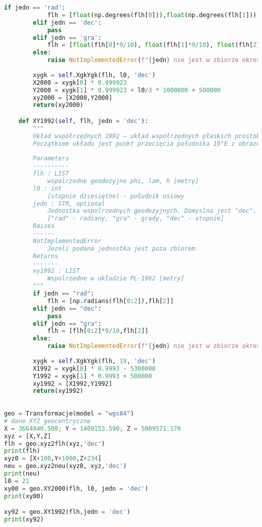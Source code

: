 \begin{lstlisting}[caption={\emph{Treść programu}}, language=Python]
        if jedn == 'rad':
            flh = [float(np.degrees(flh[0])),float(np.degrees(flh[1])),float(flh[2])]
        elif jedn == 'dec':
            pass
        elif jedn == 'gra':
            flh = [float(flh[0]*9/10), float(flh[1]*9/10), float(flh[2])]
        else:
            raise NotImplementedError(f"{jedn} nie jest w zbiorze okreslen")
       
        xygk = self.XgkYgk(flh, l0, 'dec')
        X2000 = xygk[0] * 0.999923 
        Y2000 = xygk[1] * 0.999923 + l0/3 * 1000000 + 500000
        xy2000 = [X2000,Y2000]
        return(xy2000)

    def XY1992(self, flh, jedn = 'dec'):
        """
        Układ współrzędnych 1992 – układ współrzędnych płaskich prostokątnych oparty na odwzorowaniu Gaussa-Krügera dla elipsoidy GRS80 w jednej dziesięciostopniowej strefie.
        Początkiem układu jest punkt przecięcia południka 19°E z obrazem równika.
        
        Parameters
        ----------
        flh : LIST
            wspolrzedne geodezyjne phi, lam, h [metry]
        l0 : int
            [stopnie dziesiętne] - południk osiowy
        jedn : STR, optional
            Jednostka wspolrzednych geodezyjnych. Domyslna jest "dec".
            ["rad" - radiany, "gra" - grady, "dec" - stopnie]
        Raises
        ------
        NotImplementedError
            Jezeli podana jednostka jest poza zbiorem.
        Returns
        -------
        xy1992 : LIST
            Wspolrzedne w układzie PL-1992 [metry]
        """
        if jedn == "rad":
            flh = [np.radians(flh[0:2]),flh[2]]
        elif jedn == "dec":
            pass
        elif jedn == "gra":
            flh = [flh[0:2]*9/10,flh[2]]
        else:
            raise NotImplementedError(f"{jedn} nie jest w zbiorze okreslen")
        
        xygk = self.XgkYgk(flh, 19, 'dec')
        X1992 = xygk[0] * 0.9993 - 5300000
        Y1992 = xygk[1] * 0.9993 + 500000
        xy1992 = [X1992,Y1992]
        return(xy1992)
       
        
geo = Transformacje(model = "wgs84")
# dane XYZ geocentryczne
X = 3664940.500; Y = 1409153.590; Z = 5009571.170
xyz = [X,Y,Z]
flh = geo.xyz2flh(xyz,'dec')
print(flh)
xyz0 = [X+100,Y+1000,Z+234]
neu = geo.xyz2neu(xyz0, xyz,'dec')
print(neu)
l0 = 21
xy00 = geo.XY2000(flh, l0, jedn = 'dec')
print(xy00)

xy92 = geo.XY1992(flh,jedn = 'dec')
print(xy92)


\end{lstlisting}